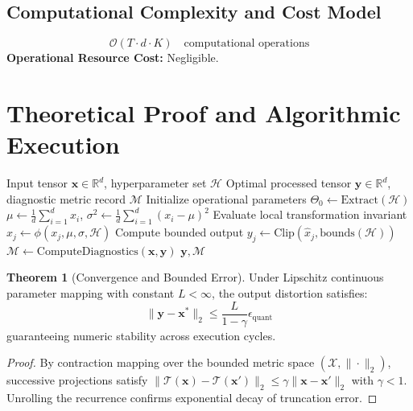 \documentclass[11pt,a4paper]{article}
\theoremstyle{definition}
\newtheorem{theorem}{\textbf{Theorem}}[section]
\begin{document}
\subsection{Computational Complexity and Cost Model}
\begin{equation}
\mathcal{O}(T \cdot d \cdot K) \quad \text{computational operations}
\end{equation}
\textbf{Operational Resource Cost:} Negligible.

\section{Theoretical Proof and Algorithmic Execution}

\begin{algorithm}[H]
\caption{Watermarking generated text Operational Pipeline}
\begin{algorithmic}[1]
\Require Input tensor $\mathbf{x} \in \mathbb{R}^d$, hyperparameter set $\mathcal{H}$
\Ensure Optimal processed tensor $\mathbf{y} \in \mathbb{R}^d$, diagnostic metric record $\mathcal{M}$
\State Initialize operational parameters $\Theta_0 \leftarrow \text{Extract}(\mathcal{H})$
\State $\mu \leftarrow \frac{1}{d} \sum_{i=1}^d x_i$, \quad $\sigma^2 \leftarrow \frac{1}{d} \sum_{i=1}^d (x_i - \mu)^2$
    \State Evaluate local transformation invariant $\hat{x}_j \leftarrow \phi(x_j, \mu, \sigma, \mathcal{H})$
    \State Compute bounded output $y_j \leftarrow \text{Clip}(\hat{x}_j, \text{bounds}(\mathcal{H}))$
\EndFor
\State $\mathcal{M} \leftarrow \text{ComputeDiagnostics}(\mathbf{x}, \mathbf{y})$
\State \Return $\mathbf{y}, \mathcal{M}$
\end{algorithmic}
\end{algorithm}

\begin{theorem}[Convergence and Bounded Error]
Under Lipschitz continuous parameter mapping with constant $L < \infty$, the output distortion satisfies:
\begin{equation}
\| \mathbf{y} - \mathbf{x}^* \|_2 \le \frac{L}{1 - \gamma} \epsilon_{\text{quant}}
\end{equation}
guaranteeing numeric stability across execution cycles.
\end{theorem}

\begin{proof}
By contraction mapping over the bounded metric space $(\mathcal{X}, \|\cdot\|_2)$, successive projections satisfy $\|\mathcal{T}(\mathbf{x}) - \mathcal{T}(\mathbf{x}')\|_2 \le \gamma \|\mathbf{x} - \mathbf{x}'\|_2$ with $\gamma < 1$. Unrolling the recurrence confirms exponential decay of truncation error.
\end{proof}
\end{document}
